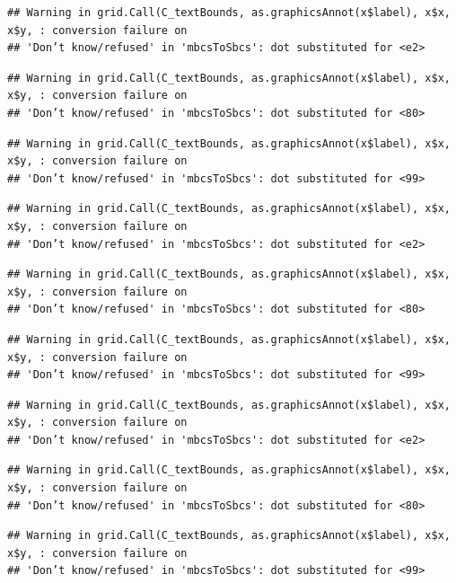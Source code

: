 \documentclass[
]{article}
\begin{document}
\begin{verbatim}
## Warning in grid.Call(C_textBounds, as.graphicsAnnot(x$label), x$x, x$y, : conversion failure on
## 'Don’t know/refused' in 'mbcsToSbcs': dot substituted for <e2>
\end{verbatim}

\begin{verbatim}
## Warning in grid.Call(C_textBounds, as.graphicsAnnot(x$label), x$x, x$y, : conversion failure on
## 'Don’t know/refused' in 'mbcsToSbcs': dot substituted for <80>
\end{verbatim}

\begin{verbatim}
## Warning in grid.Call(C_textBounds, as.graphicsAnnot(x$label), x$x, x$y, : conversion failure on
## 'Don’t know/refused' in 'mbcsToSbcs': dot substituted for <99>
\end{verbatim}

\begin{verbatim}
## Warning in grid.Call(C_textBounds, as.graphicsAnnot(x$label), x$x, x$y, : conversion failure on
## 'Don’t know/refused' in 'mbcsToSbcs': dot substituted for <e2>
\end{verbatim}

\begin{verbatim}
## Warning in grid.Call(C_textBounds, as.graphicsAnnot(x$label), x$x, x$y, : conversion failure on
## 'Don’t know/refused' in 'mbcsToSbcs': dot substituted for <80>
\end{verbatim}

\begin{verbatim}
## Warning in grid.Call(C_textBounds, as.graphicsAnnot(x$label), x$x, x$y, : conversion failure on
## 'Don’t know/refused' in 'mbcsToSbcs': dot substituted for <99>
\end{verbatim}

\begin{verbatim}
## Warning in grid.Call(C_textBounds, as.graphicsAnnot(x$label), x$x, x$y, : conversion failure on
## 'Don’t know/refused' in 'mbcsToSbcs': dot substituted for <e2>
\end{verbatim}

\begin{verbatim}
## Warning in grid.Call(C_textBounds, as.graphicsAnnot(x$label), x$x, x$y, : conversion failure on
## 'Don’t know/refused' in 'mbcsToSbcs': dot substituted for <80>
\end{verbatim}

\begin{verbatim}
## Warning in grid.Call(C_textBounds, as.graphicsAnnot(x$label), x$x, x$y, : conversion failure on
## 'Don’t know/refused' in 'mbcsToSbcs': dot substituted for <99>
\end{verbatim}
\end{document}
